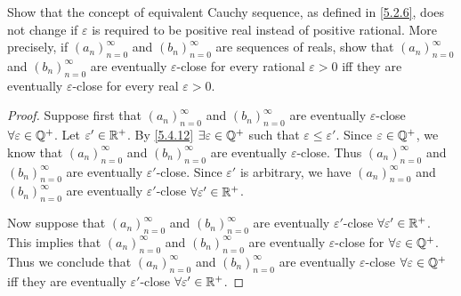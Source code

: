 \begin{ex}\label{ex:6.1.10}
  Show that the concept of equivalent Cauchy sequence, as defined in \cref{5.2.6}, does not change if \(\varepsilon\) is required to be positive real instead of positive rational.
  More precisely, if \((a_n)_{n = 0}^\infty\) and \((b_n)_{n = 0}^\infty\) are sequences of reals, show that \((a_n)_{n = 0}^\infty\) and \((b_n)_{n = 0}^\infty\) are eventually \(\varepsilon\)-close for every rational \(\varepsilon > 0\) iff they are eventually \(\varepsilon\)-close for every real \(\varepsilon > 0\).
\end{ex}

\begin{proof}
  Suppose first that \((a_n)_{n = 0}^\infty\) and \((b_n)_{n = 0}^\infty\) are eventually \(\varepsilon\)-close \(\forall \varepsilon \in \mathbb{Q}^+\).
  Let \(\varepsilon' \in \mathbb{R}^+\).
  By \cref{5.4.12} \(\exists \varepsilon \in \mathbb{Q}^+\) such that \(\varepsilon \leq \varepsilon'\).
  Since \(\varepsilon \in \mathbb{Q}^+\), we know that \((a_n)_{n = 0}^\infty\) and \((b_n)_{n = 0}^\infty\) are eventually \(\varepsilon\)-close.
  Thus \((a_n)_{n = 0}^\infty\) and \((b_n)_{n = 0}^\infty\) are eventually \(\varepsilon'\)-close.
  Since \(\varepsilon'\) is arbitrary, we have \((a_n)_{n = 0}^\infty\) and \((b_n)_{n = 0}^\infty\) are eventually \(\varepsilon'\)-close \(\forall \varepsilon' \in \mathbb{R}^+\).

  Now suppose that \((a_n)_{n = 0}^\infty\) and \((b_n)_{n = 0}^\infty\) are eventually \(\varepsilon'\)-close \(\forall \varepsilon' \in \mathbb{R}^+\).
  This implies that \((a_n)_{n = 0}^\infty\) and \((b_n)_{n = 0}^\infty\) are eventually \(\varepsilon\)-close for \(\forall \varepsilon \in \mathbb{Q}^+\).
  Thus we conclude that \((a_n)_{n = 0}^\infty\) and \((b_n)_{n = 0}^\infty\) are eventually \(\varepsilon\)-close \(\forall \varepsilon \in \mathbb{Q}^+\) iff they are eventually \(\varepsilon'\)-close \(\forall \varepsilon' \in \mathbb{R}^+\).
\end{proof}
